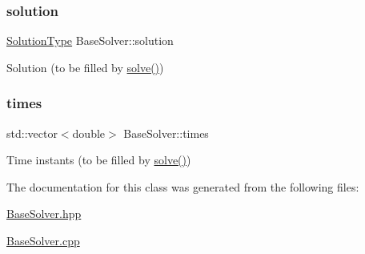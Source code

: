 \subsubsection{\texorpdfstring{solution}{solution}}
{\footnotesize\ttfamily \hyperlink{utils_8hpp_a400268d86a9a9e939d9cce230bafc868}{Solution\+Type} Base\+Solver\+::solution\hspace{0.3cm}{\ttfamily [protected]}}



Solution (to be filled by \hyperlink{classBaseSolver_a57f3b4ddec8693c61917aa37a2bac660}{solve()}) 

\mbox{\label{classBaseSolver_af772ecc8a738ec9b6f1b0fa470be2158}} 
\subsubsection{\texorpdfstring{times}{times}}
{\footnotesize\ttfamily std\+::vector$<$double$>$ Base\+Solver\+::times\hspace{0.3cm}{\ttfamily [protected]}}



Time instants (to be filled by \hyperlink{classBaseSolver_a57f3b4ddec8693c61917aa37a2bac660}{solve()}) 



The documentation for this class was generated from the following files\+:\begin{DoxyCompactItemize}
\item 
\hyperlink{BaseSolver_8hpp}{Base\+Solver.\+hpp}\item 
\hyperlink{BaseSolver_8cpp}{Base\+Solver.\+cpp}\end{DoxyCompactItemize}
